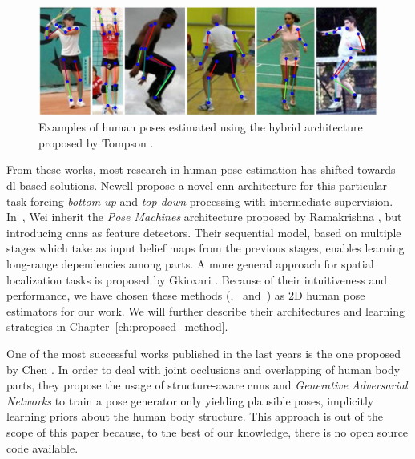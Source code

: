 \begin{figure}[h]
    \centering
    \includegraphics[width=\textwidth]{figures/tompson.JPG}
    \caption{Examples of human poses estimated using the hybrid architecture proposed by Tompson \etal\cite{Tompson2014-iq}.}
    \label{fig:tompson}
\end{figure}

From these works, most research in human pose estimation has shifted towards \gls{dl}-based solutions. Newell \etal\cite{Newell2016-cy} propose a novel \gls{cnn} architecture for this particular task forcing \textit{bottom-up} and \textit{top-down} processing with intermediate supervision. In~\cite{Wei2016-rb}, Wei \etal inherit the \textit{Pose Machines} architecture proposed by Ramakrishna \etal\cite{Ramakrishna2014-ul}, but introducing \glspl{cnn} as feature detectors. Their sequential model, based on multiple stages which take as input belief maps from the previous stages, enables learning long-range dependencies among parts. A more general approach for spatial localization tasks is proposed by Gkioxari \etal\cite{Gkioxari2016-ix}. Because of their intuitiveness and performance, we have chosen these methods (\cite{Newell2016-cy},~\cite{Wei2016-rb} and~\cite{Gkioxari2016-ix}) as 2D human pose estimators for our work. We will further describe their architectures and learning strategies in Chapter~\ref{ch:proposed_method}.

One of the most successful works published in the last years is the one proposed by Chen \etal\cite{Chen2017-pd}. In order to deal with joint occlusions and overlapping of human body parts, they propose the usage of structure-aware \glspl{cnn} and \emph{Generative Adversarial Networks} to train a pose generator only yielding plausible poses, implicitly learning priors about the human body structure. This approach is out of the scope of this paper because, to the best of our knowledge, there is no open source code available.

